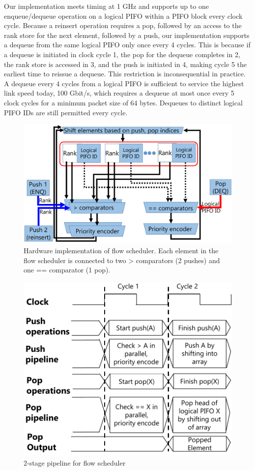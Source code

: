 Our implementation meets timing at 1 GHz and supports up to one enqueue/dequeue
operation on a logical PIFO within a PIFO block every clock cycle. Because a
reinsert operation requires a pop, followed by an access to the rank store for
the next element, followed by a push, our implementation supports a dequeue
from the same logical PIFO only once every 4 cycles. This is because if a dequeue is initiated
in clock cycle 1, the pop for the dequeue completes in 2, the rank store is accessed in 3, and
the push is initiated in 4, making cycle 5 the earliest time to reissue a dequeue.
This restriction is inconsequential in practice.  A dequeue every 4 cycles from
a logical PIFO is sufficient to service the highest link speed today, 100
Gbit/s, which requires a dequeue at most once every 5 clock cycles for a
minimum packet size of 64 bytes. Dequeues to distinct logical PIFO IDs are
still permitted every cycle.

\begin{figure}[!t]
  \centering
  \includegraphics[width=0.6\columnwidth]{pifo_flow_scheduler_hardware.pdf}
  \caption{Hardware implementation of flow scheduler. Each element in the flow
  scheduler is connected to two > comparators (2 pushes) and one == comparator (1
  pop).}
  \label{fig:flow_scheduler}
\end{figure}

\begin{figure}[!t]
  \centering
  \includegraphics[width=0.6\columnwidth]{pifo_2stage_pipeline.pdf}
  \caption{2-stage pipeline for flow scheduler}
  \label{fig:2stage}
\end{figure}


